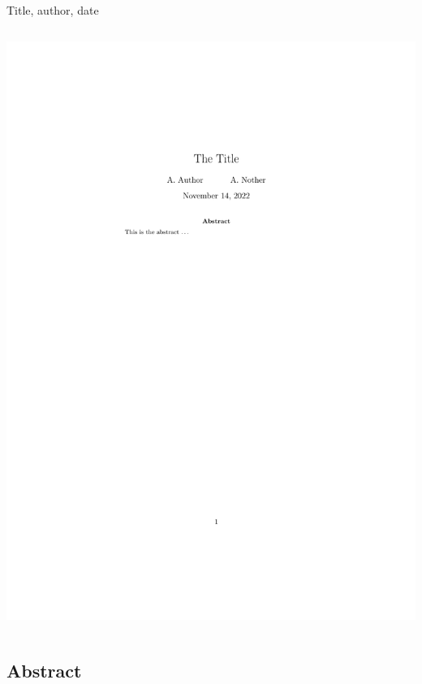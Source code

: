 \documentclass[,aspectratio=43]{beamer}
\begin{document}
\begin{frame}[fragile]{Title, author, date}
\begin{columns}[T]
\begin{column}{0.43\textwidth}
\begin{center}\includegraphics[width=1\linewidth]{figure/maketitle} \end{center}
\end{column}
\end{columns}
\end{frame}

\hypertarget{abstract}{%
\subsection{Abstract}\label{abstract}}
\end{document}
